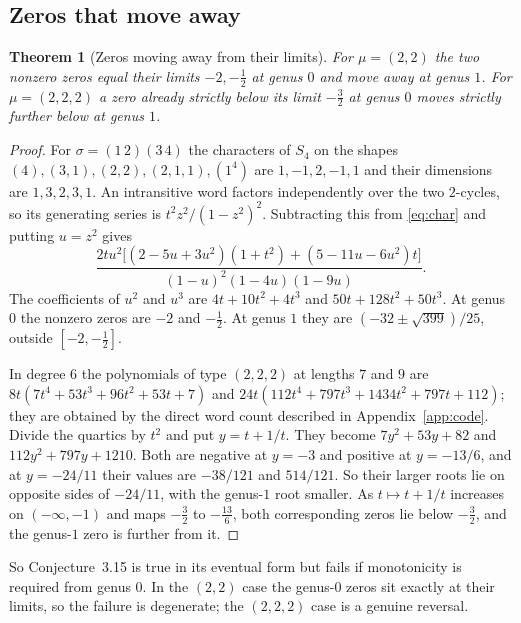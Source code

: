 \documentclass[11pt,a4paper]{article}
\newtheorem{theorem}{Theorem}[section]
\theoremstyle{definition}\newtheorem{definition}[theorem]{Definition}
\theoremstyle{remark}\newtheorem{remark}[theorem]{Remark}\newtheorem{example}[theorem]{Example}
\numberwithin{equation}{section}
\begin{document}
\subsection{Zeros that move away}
\begin{theorem}[Zeros moving away from their limits]\label{th:reverse}
For $\mu=(2,2)$ the two nonzero zeros equal their limits $-2,-\frac12$ at genus $0$ and move away at genus $1$. For $\mu=(2,2,2)$ a zero already strictly below its limit $-\frac32$ at genus $0$ moves strictly further below at genus $1$.
\end{theorem}
\begin{proof}
For $\sigma=(1\,2)(3\,4)$ the characters of $S_4$ on the shapes $(4),(3,1),(2,2),(2,1,1),(1^4)$ are $1,-1,2,-1,1$ and their dimensions are $1,3,2,3,1$. An intransitive word factors independently over the two $2$-cycles, so its generating series is $t^2z^2/(1-z^2)^2$. Subtracting this from \eqref{eq:char} and putting $u=z^2$ gives
\[
 \frac{2tu^2\bigl[(2-5u+3u^2)(1+t^2)+(5-11u-6u^2)t\bigr]}{(1-u)^2(1-4u)(1-9u)} .
\]
The coefficients of $u^2$ and $u^3$ are $4t+10t^2+4t^3$ and $50t+128t^2+50t^3$. At genus $0$ the nonzero zeros are $-2$ and $-\frac12$. At genus $1$ they are $(-32\pm\sqrt{399})/25$, outside $[-2,-\frac12]$.

In degree $6$ the polynomials of type $(2,2,2)$ at lengths $7$ and $9$ are $8t(7t^4+53t^3+96t^2+53t+7)$ and $24t(112t^4+797t^3+1434t^2+797t+112)$; they are obtained by the direct word count described in Appendix~\ref{app:code}. Divide the quartics by $t^2$ and put $y=t+1/t$. They become $7y^2+53y+82$ and $112y^2+797y+1210$. Both are negative at $y=-3$ and positive at $y=-13/6$, and at $y=-24/11$ their values are $-38/121$ and $514/121$. So their larger roots lie on opposite sides of $-24/11$, with the genus-$1$ root smaller. As $t\mapsto t+1/t$ increases on $(-\infty,-1)$ and maps $-\frac32$ to $-\frac{13}6$, both corresponding zeros lie below $-\frac32$, and the genus-$1$ zero is further from it.
\end{proof}

So Conjecture~3.15 is true in its eventual form but fails if monotonicity is required from genus $0$. In the $(2,2)$ case the genus-$0$ zeros sit exactly at their limits, so the failure is degenerate; the $(2,2,2)$ case is a genuine reversal.
\end{document}
